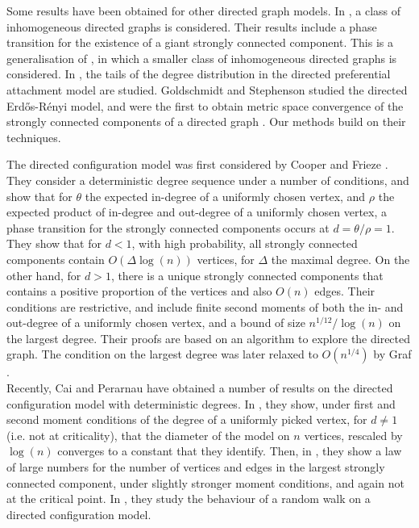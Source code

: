 Some results have been obtained for other directed graph models. In \cite{caoConnectivityGeneralClass2019}, a class of inhomogeneous directed graphs is considered. Their results include a phase transition for the existence of a giant strongly connected component. This is a generalisation of \cite{Bloznelis2012}, in which a smaller class of inhomogeneous directed graphs is considered. In \cite{Samorodnitsky2016}, the tails of the degree distribution in the directed preferential attachment model are studied. Goldschmidt and Stephenson studied the directed Erd\H{o}s-R\'enyi model, and were the first to obtain metric space convergence of the strongly connected components of a directed graph \cite{goldschmidtScalingLimitCritical2019}. Our methods build on their techniques.

The directed configuration model was first considered by Cooper and Frieze \cite{cooperSizeLargestStrongly2004}. They consider a deterministic degree sequence under a number of conditions, and show that for $\theta$ the expected in-degree of a uniformly chosen vertex, and $\rho$ the expected product of in-degree and out-degree of a uniformly chosen vertex, a phase transition for the strongly connected components occurs at $d=\theta/\rho=1$. They show that for $d<1$, with high probability, all strongly connected components contain $O(\Delta\log(n))$ vertices, for $\Delta$ the maximal degree. On the other hand, for $d>1$, there is a unique strongly connected components that contains a positive proportion of the vertices and also $O(n)$ edges. Their conditions are restrictive, and include finite second moments of both the in- and out-degree of a uniformly chosen vertex, and a bound of size $n^{1/12}/\log(n)$ on the largest degree. Their proofs are based on an algorithm to explore the directed graph. The condition on the largest degree was later relaxed to $O(n^{1/4})$ by Graf \cite{Graf2016}.\\

Recently, Cai and Perarnau have obtained a number of results on the directed configuration model with deterministic degrees. In \cite{caiDiameterDirectedConfiguration2020}, they show, under first and second moment conditions of the degree of a uniformly picked vertex, for $d\neq 1$ (i.e. not at criticality), that the diameter of the model on $n$ vertices, rescaled by $\log(n)$ converges to a constant that they identify. Then, in \cite{caiGiantComponentDirected2020}, they show a law of large numbers for the number of vertices and edges in the largest strongly connected component, under slightly stronger moment conditions, and again not at the critical point. In \cite{cai2021rw}, they study the behaviour of a random walk on a directed configuration model.
 
